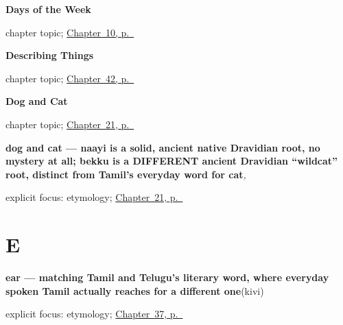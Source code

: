 \noindent\begin{minipage}[t]{\linewidth}
\raggedright
\textbf{Days of the Week}\par
\footnotesize chapter topic; \hyperref[ch:ka-days-of-the-week]{Chapter~10, p.~\pageref*{ch:ka-days-of-the-week}}
\end{minipage}\par\smallskip

\noindent\begin{minipage}[t]{\linewidth}
\raggedright
\textbf{Describing Things}\par
\footnotesize chapter topic; \hyperref[ch:kn-describing-things]{Chapter~42, p.~\pageref*{ch:kn-describing-things}}
\end{minipage}\par\smallskip

\noindent\begin{minipage}[t]{\linewidth}
\raggedright
\textbf{Dog and Cat}\par
\footnotesize chapter topic; \hyperref[ch:ka-dog-and-cat]{Chapter~21, p.~\pageref*{ch:ka-dog-and-cat}}
\end{minipage}\par\smallskip

\noindent\begin{minipage}[t]{\linewidth}
\raggedright
\textbf{dog and cat — naayi is a solid, ancient native Dravidian root, no mystery at all; bekku is a DIFFERENT ancient Dravidian \textquotedblleft{}wildcat\textquotedblright{} root, distinct from Tamil's everyday word for cat}\enspace\emph{, }\par
\footnotesize explicit focus: etymology; \hyperref[ch:ka-dog-and-cat]{Chapter~21, p.~\pageref*{ch:ka-dog-and-cat}}
\end{minipage}\par\smallskip

\section*{E}

\noindent\begin{minipage}[t]{\linewidth}
\raggedright
\textbf{ear — matching Tamil and Telugu's literary word, where everyday spoken Tamil actually reaches for a different one}\enspace\emph{}\enspace(kivi)\par
\footnotesize explicit focus: etymology; \hyperref[ch:ka-face-words]{Chapter~37, p.~\pageref*{ch:ka-face-words}}
\end{minipage}\par\smallskip

